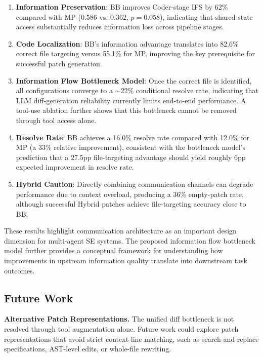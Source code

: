 \documentclass{ieeeaccess}
\begin{document}
\begin{enumerate}
\item \textbf{Information Preservation}: BB improves Coder-stage IFS by 62\% compared with MP (0.586 vs. 0.362, $p = 0.058$), indicating that shared-state access substantially reduces information loss across pipeline stages.

\item \textbf{Code Localization}: BB's information advantage translates into 82.6\% correct file targeting versus 55.1\% for MP, improving the key prerequisite for successful patch generation.

\item \textbf{Information Flow Bottleneck Model}: Once the correct file is identified, all configurations converge to a $\sim$22\% conditional resolve rate, indicating that LLM diff-generation reliability currently limits end-to-end performance. A tool-use ablation further shows that this bottleneck cannot be removed through tool access alone.

\item \textbf{Resolve Rate}: BB achieves a 16.0\% resolve rate compared with 12.0\% for MP (a 33\% relative improvement), consistent with the bottleneck model's prediction that a 27.5pp file-targeting advantage should yield roughly 6pp expected improvement in resolve rate.

\item \textbf{Hybrid Caution}: Directly combining communication channels can degrade performance due to context overload, producing a 36\% empty-patch rate, although successful Hybrid patches achieve file-targeting accuracy close to BB.

\end{enumerate}
These results highlight communication architecture as an important design dimension for multi-agent SE systems. The proposed information flow bottleneck model further provides a conceptual framework for understanding how improvements in upstream information quality translate into downstream task outcomes.

\subsection{Future Work}

\textbf{Alternative Patch Representations.} The unified diff bottleneck is not resolved through tool augmentation alone. Future work could explore patch representations that avoid strict context-line matching, such as search-and-replace specifications, AST-level edits, or whole-file rewriting.
\end{document}
